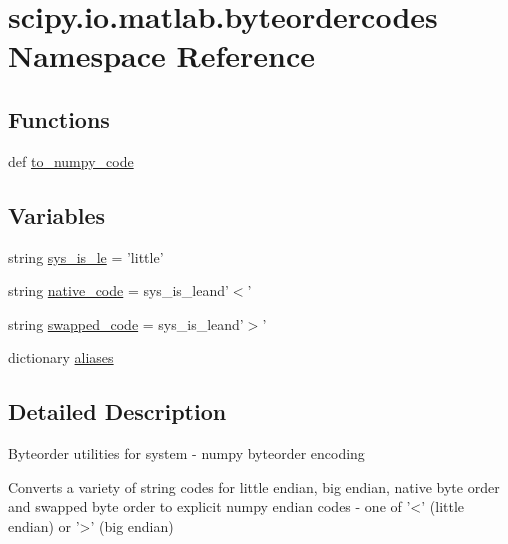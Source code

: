 \hypertarget{namespacescipy_1_1io_1_1matlab_1_1byteordercodes}{}\section{scipy.\+io.\+matlab.\+byteordercodes Namespace Reference}
\label{namespacescipy_1_1io_1_1matlab_1_1byteordercodes}
\subsection*{Functions}
\begin{DoxyCompactItemize}
\item 
def \hyperlink{namespacescipy_1_1io_1_1matlab_1_1byteordercodes_a29979423261edc90b8c01c42092ed8a9}{to\+\_\+numpy\+\_\+code}
\end{DoxyCompactItemize}
\subsection*{Variables}
\begin{DoxyCompactItemize}
\item 
string \hyperlink{namespacescipy_1_1io_1_1matlab_1_1byteordercodes_a33a2864049162c99adff6bfdd3f9561f}{sys\+\_\+is\+\_\+le} = 'little'
\item 
string \hyperlink{namespacescipy_1_1io_1_1matlab_1_1byteordercodes_a85c3d9d0b8f0e6a10e799dcfe42b2601}{native\+\_\+code} = sys\+\_\+is\+\_\+leand'$<$'
\item 
string \hyperlink{namespacescipy_1_1io_1_1matlab_1_1byteordercodes_a04cd55b4d02ecf384bc66b1934dd7079}{swapped\+\_\+code} = sys\+\_\+is\+\_\+leand'$>$'
\item 
dictionary \hyperlink{namespacescipy_1_1io_1_1matlab_1_1byteordercodes_a910ab30880606690c14a385c87d8d3cb}{aliases}
\end{DoxyCompactItemize}


\subsection{Detailed Description}
\begin{DoxyVerb}Byteorder utilities for system - numpy byteorder encoding

Converts a variety of string codes for little endian, big endian,
native byte order and swapped byte order to explicit numpy endian
codes - one of '<' (little endian) or '>' (big endian)\end{DoxyVerb}
 

